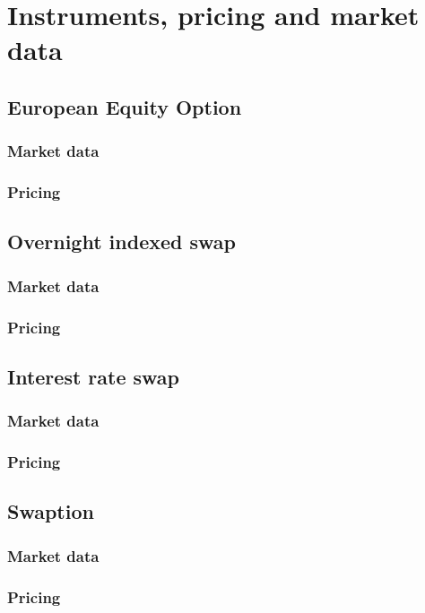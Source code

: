 \documentclass[../Thesis_AHoecherl.tex]{subfiles}
\begin{document}
    \section{Instruments, pricing and market data}
    \subsection{European Equity Option}
    \subsubsection{Market data}
    \subsubsection{Pricing}
    \subsection{Overnight indexed swap}
    \subsubsection{Market data}
    \subsubsection{Pricing}
    \subsection{Interest rate swap}
    \subsubsection{Market data}
    \subsubsection{Pricing} 
    \subsection{Swaption}
    \subsubsection{Market data}
    \subsubsection{Pricing}
\end{document}
